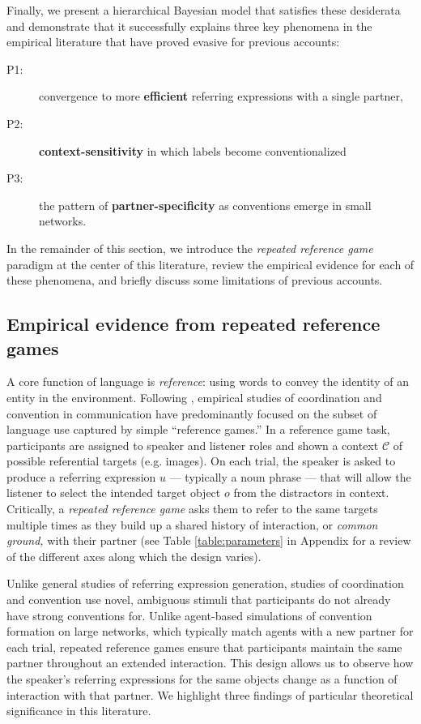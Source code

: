 Finally, we present a hierarchical Bayesian model that satisfies these desiderata and demonstrate that it successfully explains three key phenomena in the empirical literature that have proved evasive for previous accounts: 
\begin{description}
\item[P1:] convergence to more \textbf{efficient} referring expressions with a single partner, 
\item[P2:] \textbf{context-sensitivity} in which labels become conventionalized
\item[P3:] the pattern of \textbf{partner-specificity} as conventions emerge in small networks.
\end{description}
In the remainder of this section, we introduce the \emph{repeated reference game} paradigm at the center of this literature, review the empirical evidence for each of these phenomena, and briefly discuss some limitations of previous accounts.

\subsection{Empirical evidence from repeated reference games}

A core function of language is \emph{reference}: using words to convey the identity of an entity in the environment. 
Following , empirical studies of coordination and convention in communication have predominantly focused on the subset of language use captured by simple ``reference games.'' 
In a reference game task, participants are assigned to speaker and listener roles and shown a context $\mathcal{C}$ of possible referential targets (e.g. images).
On each trial, the speaker is asked to produce a referring expression $u$ --- typically a noun phrase --- that will allow the listener to select the intended target object $o$ from the distractors in context.
Critically, a \emph{repeated reference game} asks them to refer to the same targets multiple times as they build up a shared history of interaction, or \emph{common ground,} with their partner (see Table \ref{table:parameters} in Appendix for a review of the different axes along which the design varies).

Unlike general studies of referring expression generation, studies of coordination and convention use novel, ambiguous stimuli that participants do not already have strong conventions for.
Unlike agent-based simulations of convention formation on large networks, which typically match agents with a new partner for each trial, repeated reference games ensure that participants maintain the same partner throughout an extended interaction.
This design allows us to observe how the speaker's referring expressions for the same objects change as a function of interaction with that partner.
We highlight three findings of particular theoretical significance in this literature.

